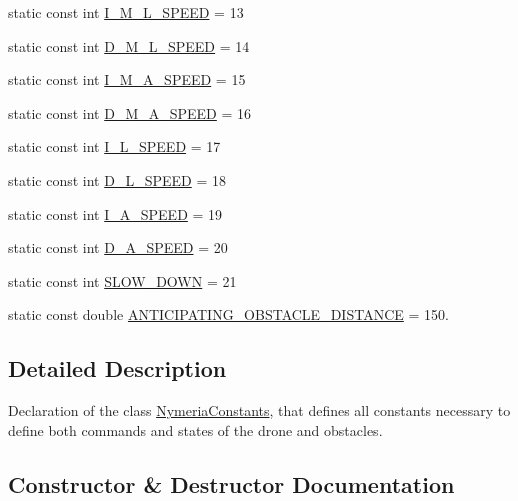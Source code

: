 \begin{DoxyCompactItemize}
\item 
static const int \hyperlink{class_nymeria_constants_a47458314a45b62fa88b788898bff102c}{I\+\_\+\+M\+\_\+\+L\+\_\+\+S\+P\+E\+E\+D} = 13
\item 
static const int \hyperlink{class_nymeria_constants_ae7a9441e371fde08e5367f18157512b0}{D\+\_\+\+M\+\_\+\+L\+\_\+\+S\+P\+E\+E\+D} = 14
\item 
static const int \hyperlink{class_nymeria_constants_aa61c87c1176a173f9d4b9c9b51a50e8a}{I\+\_\+\+M\+\_\+\+A\+\_\+\+S\+P\+E\+E\+D} = 15
\item 
static const int \hyperlink{class_nymeria_constants_a823ccb750676679ee6b7dd0cae814308}{D\+\_\+\+M\+\_\+\+A\+\_\+\+S\+P\+E\+E\+D} = 16
\item 
static const int \hyperlink{class_nymeria_constants_a2c0e8ae1830204cfa24ab86864f35527}{I\+\_\+\+L\+\_\+\+S\+P\+E\+E\+D} = 17
\item 
static const int \hyperlink{class_nymeria_constants_a496b941c8154550cf4633f0dc60ca941}{D\+\_\+\+L\+\_\+\+S\+P\+E\+E\+D} = 18
\item 
static const int \hyperlink{class_nymeria_constants_ae208027ae08534d0d2b00c55153a543b}{I\+\_\+\+A\+\_\+\+S\+P\+E\+E\+D} = 19
\item 
static const int \hyperlink{class_nymeria_constants_a962d705f0f1680269a44d4e3071ec959}{D\+\_\+\+A\+\_\+\+S\+P\+E\+E\+D} = 20
\item 
static const int \hyperlink{class_nymeria_constants_a9267d534465088daaddeb0a22933cd6e}{S\+L\+O\+W\+\_\+\+D\+O\+W\+N} = 21
\item 
static const double \hyperlink{class_nymeria_constants_ae0b8219327ad27129ed6c97a26ec27c2}{A\+N\+T\+I\+C\+I\+P\+A\+T\+I\+N\+G\+\_\+\+O\+B\+S\+T\+A\+C\+L\+E\+\_\+\+D\+I\+S\+T\+A\+N\+C\+E} = 150.
\end{DoxyCompactItemize}


\subsection{Detailed Description}
Declaration of the class \hyperlink{class_nymeria_constants}{Nymeria\+Constants}, that defines all constants necessary to define both commands and states of the drone and obstacles. 

\subsection{Constructor \& Destructor Documentation}
\hypertarget{class_nymeria_constants_aea06abeba1780d187a74d75b9313e2c4}{}
